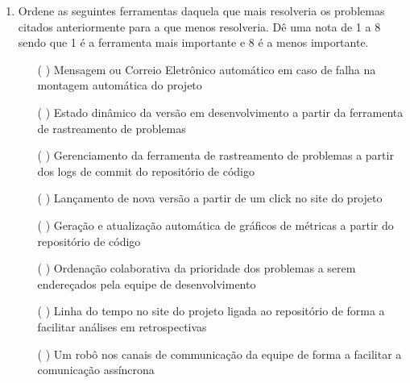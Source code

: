 \begin{enumerate}
\item Ordene as seguintes ferramentas daquela que mais resolveria os
  problemas citados anteriormente para a que menos resolveria. Dê uma
  nota de 1 a 8 sendo que 1 é a ferramenta mais importante e 8 é a
  menos importante.
  \begin{itemize}
  \item[( )] Mensagem ou Correio Eletrônico automático em caso de
    falha na montagem automática do projeto
  \item[( )] Estado dinâmico da versão em desenvolvimento a partir da
    ferramenta de rastreamento de problemas
  \item[( )] Gerenciamento da ferramenta de rastreamento de problemas
    a partir dos logs de commit do repositório de código
  \item[( )] Lançamento de nova versão a partir de um click no site do
    projeto
  \item[( )] Geração e atualização automática de gráficos de métricas
    a partir do repositório de código
  \item[( )] Ordenação colaborativa da prioridade dos problemas a
    serem endereçados pela equipe de desenvolvimento
  \item[( )] Linha do tempo no site do projeto ligada ao repositório
    de forma a facilitar análises em retrospectivas
  \item[( )] Um robô nos canais de communicação da equipe de forma a
    facilitar a comunicação assíncrona
  \end{itemize}
\end{enumerate}
